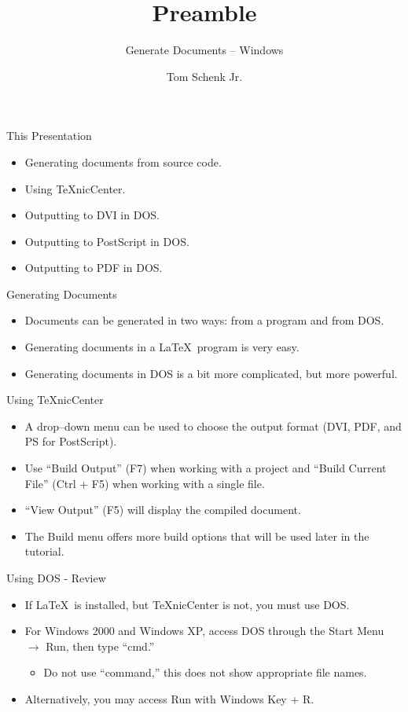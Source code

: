 \documentclass[pdf]{prosper}
\title{Preamble}
\subtitle{Generate Documents -- Windows}
\author{Tom Schenk Jr.}		%
\begin{document}
\maketitle
\begin{slide}{This Presentation}
	\begin{itemize}
		\item Generating documents from source code.
		\item Using \TeX nicCenter.
		\item Outputting to DVI in DOS.
		\item Outputting to PostScript in DOS.
		\item Outputting to PDF in DOS.
	\end{itemize}
\end{slide}
\begin{slide}{Generating Documents}
	\begin{itemize}
		\item Documents can be generated in two ways: from a program and from DOS.
		\item Generating documents in a \LaTeX\ program is very easy.
		\item Generating documents in DOS is a bit more complicated, but more powerful.
	\end{itemize}
\end{slide}
\begin{slide}{Using TeXnicCenter}
	\begin{itemize}
		\item A drop--down menu can be used to choose the output format (DVI, PDF, and PS for PostScript).
		\item Use ``Build Output'' (F7) when working with a project and ``Build Current File'' (Ctrl + F5) when working with a single file.
		\item ``View Output'' (F5) will display the compiled document.
		\item The Build menu offers more build options that will be used later in the tutorial.
	\end{itemize}
\end{slide}
\begin{slide}{Using DOS - Review}
	\begin{itemize}
		\item If \LaTeX\ is installed, but \TeX nicCenter is not, you must use DOS.
		\item For Windows 2000 and Windows XP, access DOS through the Start Menu $\rightarrow$ Run, then type ``cmd.''
			\begin{itemize}
				\item Do not use ``command,'' this does not show appropriate file names.
			\end{itemize}
		\item Alternatively, you may access Run with Windows Key + R.
	\end{itemize}
\end{slide}
\end{document}
